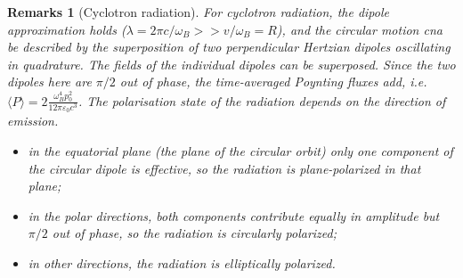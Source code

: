 \documentclass[a4paper]{article}
\newtheorem{remarks}{Remarks}[section]
\theoremstyle{new}
\begin{document}
\begin{remarks}[Cyclotron radiation]
For cyclotron radiation, the dipole approximation holds ($\lambda=2\pi c/\omega_B>>v/\omega_B=R$), and the circular motion cna be described by the superposition of two perpendicular Hertzian dipoles oscillating in quadrature. The fields of the individual dipoles can be superposed. Since the two dipoles here are $\pi/2$ out of phase, the time-averaged Poynting fluxes add, i.e. $\langle P\rangle=2\frac{\omega_B^4p_0^2}{12\pi\varepsilon_0c^3}$. The polarisation state of the radiation depends on the direction of emission.
\begin{itemize}
    \item in the equatorial plane (the plane of the circular orbit) only one component of the circular dipole is effective, so the radiation is plane-polarized in that plane;
    \item in the polar directions, both components contribute equally in amplitude but $\pi/2$ out of phase, so the radiation is circularly polarized;
    \item in other directions, the radiation is elliptically polarized.
\end{itemize}
\end{remarks}
\end{document}
